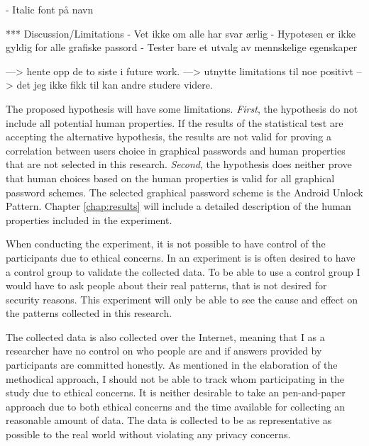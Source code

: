 - Italic font på navn


*** Discussion/Limitations
- Vet ikke om alle har svar ærlig
- Hypotesen er ikke gyldig for alle grafiske passord
- Tester bare et utvalg av mennskelige egenskaper

---> hente opp de to siste i future work.
---> utnytte limitations til noe positivt --> det jeg ikke fikk til kan andre studere videre.

The proposed hypothesis will have some limitations. {\it First}, the hypothesis do not include all potential human properties. If the results of the statistical test are accepting the alternative hypothesis, the results are not valid for proving a correlation between users choice in graphical passwords and human properties that are not selected in this research. {\it Second}, the hypothesis does neither prove that human choices based on the human properties is valid for all graphical password schemes. The selected graphical password scheme is the Android Unlock Pattern. Chapter \ref{chap:results} will include a detailed description of the human properties included in the experiment.

When conducting the experiment, it is not possible to have control of the participants due to ethical concerns. In an experiment is is often desired to have a control group to validate the collected data. To be able to use a control group I would have to ask people about their real patterns, that is not desired for security reasons. This experiment will only be able to see the cause and effect on the patterns collected in this research.

The collected data is also collected over the Internet, meaning that I as a researcher have no control on who people are and if answers provided by participants are committed honestly. As mentioned in the elaboration of the methodical approach, I should not be able to track whom participating in the study due to ethical concerns. It is neither desirable to take an pen-and-paper approach due to both ethical concerns and the time available for collecting an reasonable amount of data. The data is collected to be as representative as possible to the real world without violating any privacy concerns. 